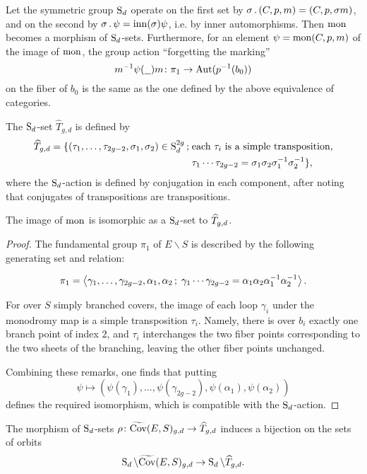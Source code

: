 Let the symmetric group $\operatorname{S}_d$ operate on the first set by $\sigma \,.\, (C,p,m)=(C,p,\sigma m)$, and on the second by $\sigma \,.\, \psi = \operatorname{inn}(\sigma) \psi$, i.e. by inner automorphisms. Then $\operatorname{mon}$ becomes a morphism of $\operatorname{S}_d$-sets.
Furthermore, for an element $\psi=\operatorname{mon}(C,p,m)$ of the image of $\operatorname{mon}$, the group action ``forgetting the marking'' \[m^{-1}\psi(\underline{\ \ })m\cl\pi_1\to \Aut(p^{-1}(b_0))\] on the fiber of $b_0$ is the same as the one defined by the above equivalence of categories.

\begin{defi}
 The $\operatorname{S}_d$-set $\widehat{T}_{g,d}$ is defined by
 \begin{align*}
 \widehat{T}_{g,d} = \{(\tau_1,\dotsc,\tau_{2g-2},\sigma_1,\sigma_2)\in \operatorname{S}_d^{2g} \,;\; &\text{each }\tau_i\text{ is a simple transposition,}\\ &\tau_1\dotsm\tau_{2g-2}=\sigma_1\sigma_2\sigma_1^{-1}\sigma_2^{-1}\},
 \end{align*}
  where the $\operatorname{S}_d$-action is defined by conjugation in each component, after noting that conjugates of transpositions are transpositions.
\end{defi}

\begin{prop} \label{prop:classifying-set}
 The image of $\operatorname{mon}$ is isomorphic as a $\operatorname{S}_d$-set to $\widehat{T}_{g,d}$.
\end{prop}

\begin{proof}
 The fundamental group $\pi_1$ of $E\smallsetminus S$ is described by the following generating set and relation:

 \[\pi_1=\left\langle \gamma_1,\dotsc,\gamma_{2g-2},\alpha_1,\alpha_2\,;\; \gamma_1\dotsm\gamma_{2g-2}=\alpha_1\alpha_2\alpha_1^{-1}\alpha_2^{-1} \right\rangle.\]

 For over $S$ simply branched covers, the image of each loop $\gamma_i$ under the monodromy map is a simple transposition $\tau_i$. Namely, there is over $b_i$ exactly one branch point of index $2$, and $\tau_i$ interchanges the two fiber points corresponding to the two sheets of the branching, leaving the other fiber points unchanged.
 
 Combining these remarks, one finds that putting
 \[\psi \mapsto (\psi(\gamma_1),\dotsc,\psi(\gamma_{2g-2}),\psi({\alpha_1}),\psi({\alpha_2}))\]
 defines the required isomorphism, which is compatible with the $\operatorname{S}_d$-action.
\end{proof}

\begin{prop} \label{prop:classification-of-covers}
 The morphism of $\operatorname{S}_d$-sets $\rho\colon \widetilde{\operatorname{Cov}}(E,S)_{g,d} \to \widehat{T}_{g,d}$ induces a bijection on the sets of orbits
 \[\operatorname{S}_d\backslash\widetilde{\operatorname{Cov}}(E,S)_{g,d}\to \operatorname{S}_d\backslash\widehat{T}_{g,d}.\] 
 
\end{prop}

